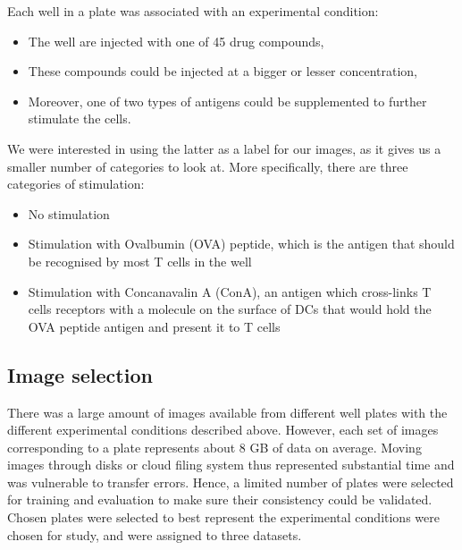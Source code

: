 Each well in a plate was associated with an experimental condition:
\begin{itemize}
    \item The well are injected with one of 45 drug compounds, 
    \item These compounds could be injected at a bigger or lesser concentration,
    \item Moreover, one of two types of antigens could be supplemented to further stimulate the cells. 
\end{itemize}

We were interested in using the latter as a label for our images, as it gives us a smaller number of categories to look at. More specifically, there are three categories of stimulation: 
\begin{itemize}
    \item No stimulation
    \item Stimulation with Ovalbumin (OVA) peptide, which is the antigen that should be recognised by most T cells in the well
    \item Stimulation with Concanavalin A (ConA), an antigen which cross-links T cells receptors with a molecule on the surface of DCs that would hold the OVA peptide antigen and present it to T cells
\end{itemize}

\subsection{Image selection} \label{subsec:selecting_dataset}

There was a large amount of images available from different well plates with the different experimental conditions described above. However, each set of images corresponding to a plate represents about 8 GB of data on average. Moving images through disks or cloud filing system thus represented substantial time and was vulnerable to transfer errors. Hence, a limited number of plates were selected for training and evaluation to make sure their consistency could be validated. Chosen plates were selected to best represent the experimental conditions were chosen for study, and were assigned to three datasets.


